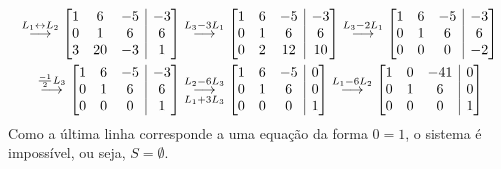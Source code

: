 \documentclass[12pt,a4paper]{article}
\makeatletter
\newenvironment{amatrix}[1]{%
  \left[\begin{array}{@{}*{#1}{c}|c@{}}
}{%
  \end{array}\right]
}
\newcommand{\grstep}[2][\relax]{%
   \ensuremath{\mathrel{
       {\mathop{\longrightarrow}\limits^{#2\mathstrut}_{
                                     \begin{subarray}{l} #1 \end{subarray}}}}}}
\makeatother
\begin{document}
\begin{enumerate}
\begin{enumerate}
\begin{align*}
[A|B]
\grstep{ L_1 \leftrightarrow L_2 }
\begin{amatrix}{3}
 1 &  6 & -5 & -3 \\
 0 &  1 &  6 &  6 \\
 3 & 20 & -3 &  1
\end{amatrix}
&
\grstep{ L_3 - 3 L_1 }
\begin{amatrix}{3}
 1 & 6 & -5 & -3 \\
 0 & 1 &  6 &  6 \\
 0 & 2 & 12 & 10
\end{amatrix}
\grstep{ L_3 - 2 L_1 }
\begin{amatrix}{3}
 1 & 6 & -5 & -3 \\
 0 & 1 &  6 &  6 \\
 0 & 0 &  0 & -2
\end{amatrix} \\
\grstep{ \frac{-1}{2} L_3 }
\begin{amatrix}{3}
 1 & 6 & -5 & -3 \\
 0 & 1 &  6 &  6 \\
 0 & 0 &  0 & 1
\end{amatrix}
&
\grstep[ L_1 + 3 L_3 ]{ L_2 - 6 L_3 }
\begin{amatrix}{3}
 1 & 6 & -5 & 0 \\
 0 & 1 &  6 & 0 \\
 0 & 0 &  0 & 1
\end{amatrix}
\grstep{ L_1 - 6 L_2 }
\begin{amatrix}{3}
 1 & 0 & -41 & 0 \\
 0 & 1 &  6 & 0 \\
 0 & 0 &  0 & 1
\end{amatrix}
\end{align*}
Como a última linha corresponde a uma equação da forma $0 = 1$, o sistema é impossível, ou seja, $S = \emptyset$.

\end{enumerate}


\end{enumerate}
\end{document}

